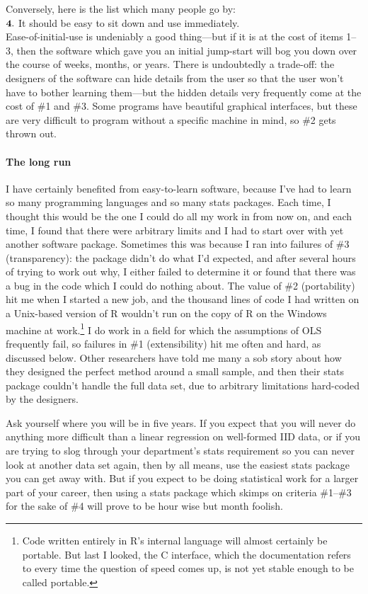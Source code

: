 {Conversely, here is the list which many people go by:\\
$\bf 4.$ It should be easy to sit down and use immediately.\\

Ease-of-initial-use is undeniably a good thing---but if it is at the cost
of items 1--3, then the software which gave you an initial jump-start will
bog you down over the course of weeks, months, or years. There is
undoubtedly a trade-off: the designers of the software can hide details
from the user so that the user won't have to bother learning them---but
the hidden details very frequently come at the cost of \#1 and \#3. Some
programs have beautiful graphical interfaces, but these are very difficult
to program without a specific machine in mind, so \#2 gets thrown out.

\paragraph{The long run}
I have certainly benefited from easy-to-learn software, because I've had to learn
so many programming languages and so many stats packages. Each time, I thought
this would be the one I could do all my work in from now on, and each time, I
found that there were arbitrary limits and I had to start over with yet another software package.
Sometimes this was because I ran into failures of \#3 (transparency): the package
didn't do what I'd expected, and after several hours of trying to work
out why, I either failed to determine it or found that there was a bug
in the code which I could do nothing about. The value of \#2 (portability) hit me
when I started a new job, and the thousand lines of code I had written on a Unix-based version of R wouldn't run
on the copy of R on the Windows machine at work.\footnote{Code written entirely in R's internal language will
almost certainly be portable. But last I looked, the C interface,
which the documentation refers to every time the question of speed comes
up, is not yet stable enough to be called portable.} I do work in a field for which the
assumptions of OLS frequently fail, so failures in \#1 (extensibility) hit me often and hard,
as discussed below. Other researchers have told me many a sob story
about how they designed the perfect method around a small sample, and
then their stats package couldn't handle the full data set, due to
arbitrary limitations hard-coded by the designers.

Ask yourself where you will be in five years. If you expect that you will never do
anything more difficult than a linear regression on well-formed IID data,
or if you are trying to slog through your department's stats requirement
so you can never look at another data set again, then by all means,
use the easiest stats package you can get away with. But if you expect to
be doing statistical work for a larger part of your career, then using a
stats package which skimps on criteria \#1--\#3 for the sake of \#4 will
prove to be hour wise but month foolish.

}

